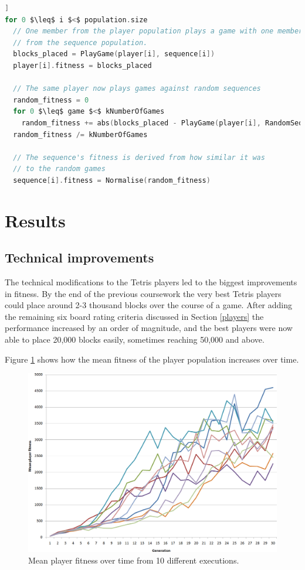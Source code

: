 \documentclass[a4paper,11pt]{article}
\begin{document}
\begin{lstlisting}[firstnumber=1,language=c,morekeywords={until,foreach,in},frame=single,mathescape=true,caption={Pseudo-code of the algorithm used to evolve one generation},label={psuedocode},float=[htb]]
for 0 $\leq$ i $<$ population.size
  // One member from the player population plays a game with one member
  // from the sequence population.
  blocks_placed = PlayGame(player[i], sequence[i])
  player[i].fitness = blocks_placed
  
  // The same player now plays games against random sequences
  random_fitness = 0
  for 0 $\leq$ game $<$ kNumberOfGames
    random_fitness += abs(blocks_placed - PlayGame(player[i], RandomSequence()))
  random_fitness /= kNumberOfGames
  
  // The sequence's fitness is derived from how similar it was
  // to the random games
  sequence[i].fitness = Normalise(random_fitness)
\end{lstlisting}

\section{Results}

\subsection{Technical improvements}

The technical modifications to the Tetris players led to the biggest
improvements in fitness.
By the end of the previous coursework the very best Tetris players could place
around 2-3 thousand blocks over the course of a game.
After adding the remaining six board rating criteria discussed in Section
\ref{players} the performance increased by an order of magnitude, and the best
players were now able to place 20,000 blocks easily, sometimes reaching 50,000
and above.

Figure \ref{LinearNoCoev} shows how the mean fitness of the player population
increases over time.

\begin{figure}[h]
  \label{LinearNoCoev}
  \centering
  \includegraphics[width=13cm]{results/linear-no-coev.png}
  \caption{Mean player fitness over time from 10 different executions.}
\end{figure}
\end{document}
